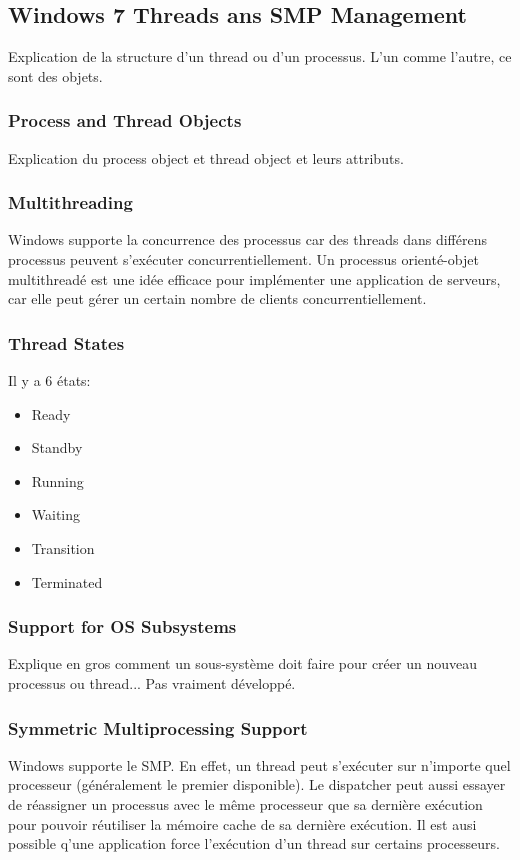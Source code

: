 \subsection{Windows 7 Threads ans SMP Management}
Explication de la structure d'un thread ou d'un processus. L'un comme l'autre, ce sont des objets.

\subsubsection{Process and Thread Objects}
Explication du process object et thread object et leurs attributs.

\subsubsection{Multithreading}
Windows supporte la concurrence des processus car des threads dans différens processus peuvent s'exécuter concurrentiellement. Un processus orienté-objet multithreadé est une idée efficace pour implémenter une application de serveurs, car elle peut gérer un certain nombre de clients concurrentiellement.

\subsubsection{Thread States}
Il y a 6 états:
\begin{itemize}
  \item Ready
  \item Standby
  \item Running
  \item Waiting
  \item Transition
  \item Terminated
\end{itemize}

\subsubsection{Support for OS Subsystems}
Explique en gros comment un sous-système doit faire pour créer un nouveau processus ou thread... Pas vraiment développé.
\subsubsection{Symmetric Multiprocessing Support}
Windows supporte le SMP. En effet, un thread peut s'exécuter sur n'importe quel processeur (généralement le premier disponible). Le dispatcher peut aussi essayer de réassigner un processus avec le même processeur que sa dernière exécution pour pouvoir réutiliser la mémoire cache de sa dernière exécution. Il est ausi possible q'une application force l'exécution d'un thread sur certains processeurs.

